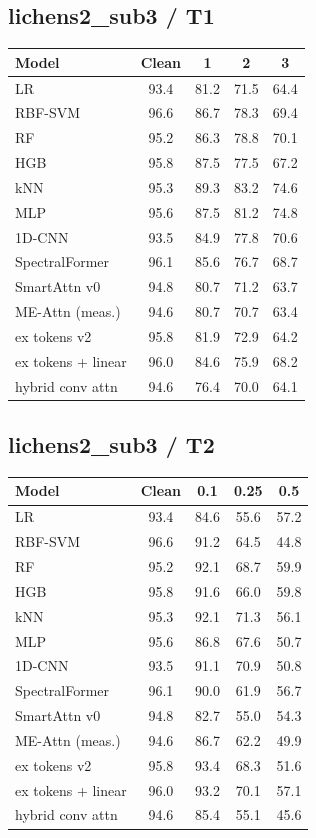 \subsection*{lichens2\_sub3 / T1}
\small
\begin{tabular}{lcccc}
\toprule
Model & Clean & 1 & 2 & 3 \\
\midrule
LR & 93.4 & 81.2 & 71.5 & 64.4 \\
RBF-SVM & 96.6 & 86.7 & 78.3 & 69.4 \\
RF & 95.2 & 86.3 & 78.8 & 70.1 \\
HGB & 95.8 & 87.5 & 77.5 & 67.2 \\
kNN & 95.3 & 89.3 & 83.2 & 74.6 \\
MLP & 95.6 & 87.5 & 81.2 & 74.8 \\
1D-CNN & 93.5 & 84.9 & 77.8 & 70.6 \\
SpectralFormer & 96.1 & 85.6 & 76.7 & 68.7 \\
SmartAttn v0 & 94.8 & 80.7 & 71.2 & 63.7 \\
ME-Attn (meas.) & 94.6 & 80.7 & 70.7 & 63.4 \\
ex tokens v2 & 95.8 & 81.9 & 72.9 & 64.2 \\
ex tokens + linear & 96.0 & 84.6 & 75.9 & 68.2 \\
hybrid conv attn & 94.6 & 76.4 & 70.0 & 64.1 \\
\bottomrule
\end{tabular}

\subsection*{lichens2\_sub3 / T2}
\small
\begin{tabular}{lcccc}
\toprule
Model & Clean & 0.1 & 0.25 & 0.5 \\
\midrule
LR & 93.4 & 84.6 & 55.6 & 57.2 \\
RBF-SVM & 96.6 & 91.2 & 64.5 & 44.8 \\
RF & 95.2 & 92.1 & 68.7 & 59.9 \\
HGB & 95.8 & 91.6 & 66.0 & 59.8 \\
kNN & 95.3 & 92.1 & 71.3 & 56.1 \\
MLP & 95.6 & 86.8 & 67.6 & 50.7 \\
1D-CNN & 93.5 & 91.1 & 70.9 & 50.8 \\
SpectralFormer & 96.1 & 90.0 & 61.9 & 56.7 \\
SmartAttn v0 & 94.8 & 82.7 & 55.0 & 54.3 \\
ME-Attn (meas.) & 94.6 & 86.7 & 62.2 & 49.9 \\
ex tokens v2 & 95.8 & 93.4 & 68.3 & 51.6 \\
ex tokens + linear & 96.0 & 93.2 & 70.1 & 57.1 \\
hybrid conv attn & 94.6 & 85.4 & 55.1 & 45.6 \\
\bottomrule
\end{tabular}

